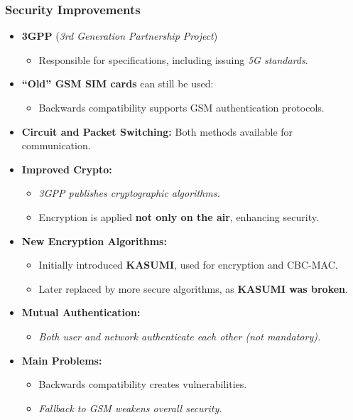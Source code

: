 \subsubsection{Security Improvements}
\begin{itemize}
    \item \textbf{3GPP} (\emph{3rd Generation Partnership Project})
    \begin{itemize}
        \item Responsible for specifications, including issuing \emph{5G standards}.
    \end{itemize}
    \item \textbf{“Old” GSM SIM cards} can still be used:
    \begin{itemize}
        \item Backwards compatibility supports GSM authentication protocols.
    \end{itemize}
    \item \textbf{Circuit and Packet Switching:} Both methods available for communication.
    \item \textbf{Improved Crypto:}
    \begin{itemize}
        \item \emph{3GPP publishes cryptographic algorithms.}
        \item Encryption is applied \textbf{not only on the air}, enhancing security.
    \end{itemize}
    \item \textbf{New Encryption Algorithms:}
    \begin{itemize}
        \item Initially introduced \textbf{KASUMI}, used for encryption and CBC-MAC.
        \item Later replaced by more secure algorithms, as \textbf{KASUMI was broken}.
    \end{itemize}
    \item \textbf{Mutual Authentication:} 
    \begin{itemize}
        \item \emph{Both user and network authenticate each other (not mandatory).}
    \end{itemize}
    \item \textbf{Main Problems:}
    \begin{itemize}
        \item Backwards compatibility creates vulnerabilities.
        \item \emph{Fallback to GSM weakens overall security.}
    \end{itemize}
\end{itemize}

